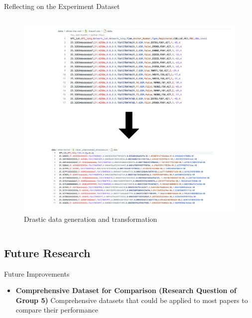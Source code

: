\documentclass[aspectratio=169, 8pt]{beamer}
\begin{document}
\begin{frame}{Reflecting on the Experiment Dataset}
\begin{columns}[T]
    \begin{column}{0.5\linewidth}
     \begin{figure}
         \centering
         \includegraphics[width = \linewidth]{images/data-ge.png}
         \caption{Drastic data generation and transformation}
         \label{fig:enter-label}
     \end{figure}
    \end{column}
\end{columns}

\end{frame}






\subsection{Future Research}
\begin{frame}{Future Improvements}

\large
\begin{itemize}
    \item \textbf{Comprehensive Dataset for Comparison (Research Question of Group 5)} Comprehensive datasets that could be applied to  most papers to compare their performance
\end{itemize}
    
\end{frame}
\end{document}
